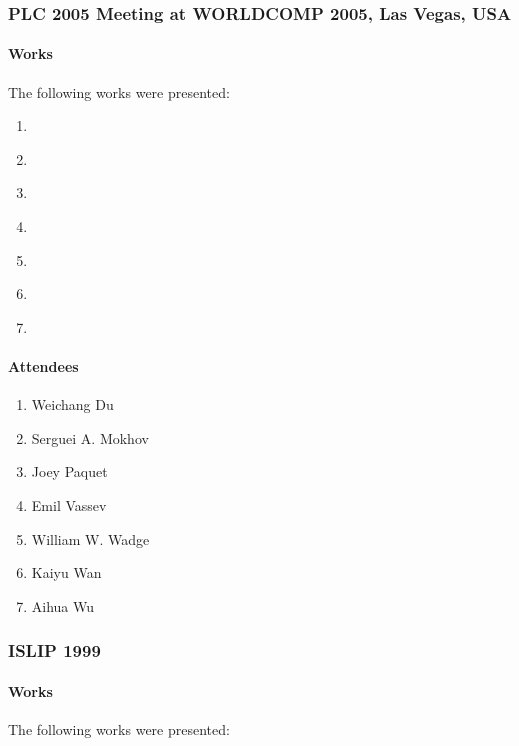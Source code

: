 \documentclass{easychair}
\newcommand{\todo}[0]
{
	{\Large }
}
\begin{document}
\subsubsection{PLC 2005 Meeting at WORLDCOMP 2005, Las Vegas, USA}
\label{sect:meeting-notes-plc2005}

\paragraph{Works}

The following works were presented:

\begin{enumerate}
	\item \cite{mokhovjlucid2005}
	\item \cite{mokhovolucid2005}
	\item \cite{mokhovgicf2005}
	\item \cite{dmf-plc05}
	\item \cite{wu05}
	\item \cite{gipsy2005}
	\item \cite{kaiyulucx}
\end{enumerate}

{\todo}

\paragraph{Attendees}

\begin{enumerate}
	\item Weichang Du
	\item Serguei A. Mokhov
	\item Joey Paquet
	\item Emil Vassev
	\item William W. Wadge
	\item Kaiyu Wan
	\item Aihua Wu
\end{enumerate}

{\todo}

\subsubsection{ISLIP 1999}
\label{sect:meeting-notes-islip1999}

\paragraph{Works}

The following works were presented:
\end{document}
